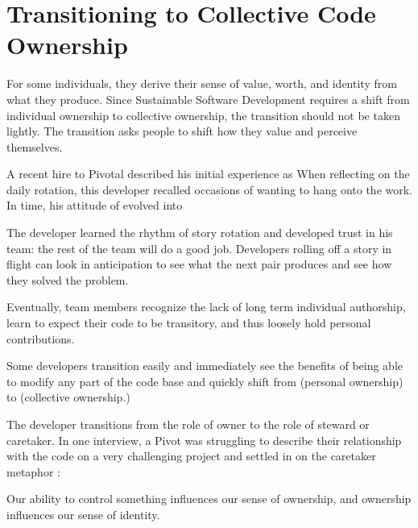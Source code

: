 \section{Transitioning to Collective Code Ownership}
\label{Transitioning}
For some individuals, they derive their sense of value, worth, and identity from what they produce. Since Sustainable Software Development requires a shift from individual ownership to collective ownership, the transition should not be taken lightly. The transition asks people to shift how they value and perceive themselves. 

A recent hire to Pivotal described his initial experience as  When reflecting on the daily rotation, this developer recalled occasions of wanting to hang onto the work.  In time, his attitude of  evolved into  

The developer learned the rhythm of story rotation and developed trust in his team: the rest of the team will do a good job. Developers rolling off a story in flight can look in anticipation to see what the next pair produces and see how they solved the problem. 

Eventually, team members recognize the lack of long term individual authorship, learn to expect their code to be transitory, and thus loosely hold personal contributions.   

Some developers transition easily and immediately see the benefits of being able to modify any part of the code base and quickly shift from  (personal ownership) to  (collective ownership.)

The developer transitions from the role of owner to the role of steward or caretaker. In one interview, a Pivot was struggling to describe their relationship with the code on a very challenging project and settled in on the caretaker metaphor : 

Our ability to control something influences our sense of ownership, and ownership influences our sense of identity. 

